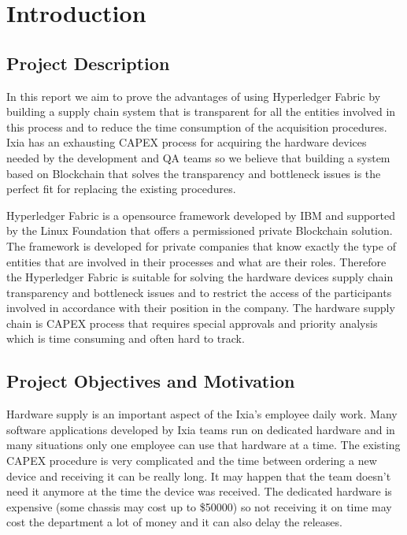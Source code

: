 \chapter{Introduction}
\label{chapter:intro}

\section{Project Description}
\label{sec:intro-section1}
In this report we aim to prove the advantages of using Hyperledger Fabric by building a supply chain system that is transparent for all the entities involved in this process and to reduce the time consumption of the acquisition procedures.
Ixia has an exhausting CAPEX process for acquiring the hardware devices needed by the development and QA teams so we believe that building a system based on Blockchain that solves the transparency and bottleneck issues is the perfect fit for replacing the existing procedures.
 

Hyperledger Fabric is a opensource framework developed by IBM and supported by the Linux Foundation that offers a permissioned private Blockchain solution. 
The framework is developed for private companies that know exactly the type of entities that are involved in their processes and what are their roles.
Therefore the Hyperledger Fabric is suitable for solving the hardware devices supply chain transparency and bottleneck issues and to restrict the access of the participants involved in accordance with their position in the company. The hardware supply chain is CAPEX process that requires special approvals and priority analysis which is time consuming and often hard to track.


\section{Project Objectives and Motivation}
\label{sec:intro-section2}
Hardware supply is an important aspect of the Ixia's employee daily work. Many software applications developed by Ixia teams run on dedicated hardware and in many situations only one employee can use that hardware at a time.
The existing CAPEX procedure is very complicated and the time between ordering a new device and receiving it can be really long. It may happen that the team doesn't need it anymore at the time the device was received. The dedicated hardware is expensive (some chassis may cost up to \$50000) so not receiving it on time may cost the department a lot of money and it can also delay the releases.

